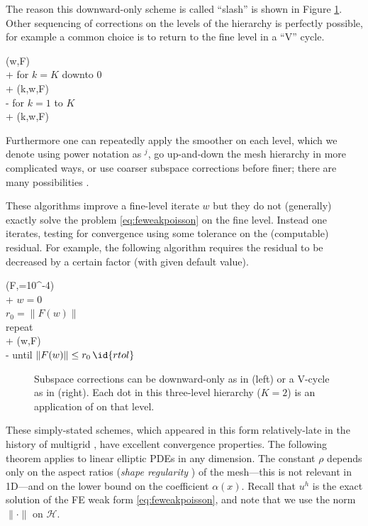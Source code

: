 \documentclass[letterpaper,final,12pt,reqno]{amsart}
\numberwithin{equation}{section}
\numberwithin{figure}{section}
\numberwithin{table}{section}
\begin{document}
The reason this downward-only scheme is called ``slash'' is shown in Figure \ref{fig:msccycles}.  Other sequencing of corrections on the levels of the hierarchy is perfectly possible, for example a common choice is to return to the fine level in a ``V'' cycle.
\begin{pseudo*}
(w,F)\text{:} \\+
    for $k=K$ downto $0$ \\+
        (k,w,F) \\-
    for $k=1$ to $K$ \\+
        (k,w,F)
\end{pseudo*}
Furthermore one can repeatedly apply the smoother on each level, which we denote using power notation as $^j$, go up-and-down the mesh hierarchy in more complicated ways, or use coarser subspace corrections before finer; there are many possibilities \cite{Trottenbergetal2001}.

These  algorithms improve a fine-level iterate $w$ but they do not (generally) exactly solve the problem \eqref{eq:feweakpoisson} on the fine level.  Instead one iterates, testing for convergence using some tolerance on the (computable) residual.  For example, the following algorithm requires the residual to be decreased by a certain factor (with given default value).
\begin{pseudo*}
(F,=10^{-4})\text{:} \\+
    $w=0$ \qquad\qquad\qquad\qquad\qquad {} \\
    $r_0 = \|F(w)\|$ \\
    repeat \\+
        (w,F) \qquad\qquad {} \\-
    until $\|F(w)\| \le r_0\, \id{rtol}$
\end{pseudo*}

\begin{figure}

\caption{Subspace corrections can be downward-only as in  (left) or a V-cycle as in  (right).  Each dot in this three-level hierarchy ($K=2$) is an application of  on that level.}
\label{fig:msccycles}
\end{figure}

These simply-stated schemes, which appeared in this form relatively-late in the history of multigrid \cite{Xu1992}, have excellent convergence properties.  The following theorem applies to linear elliptic PDEs in any dimension.  The constant $\rho$ depends only on the aspect ratios (\emph{shape regularity} \cite{Elmanetal2014}) of the mesh---this is not relevant in 1D---and on the lower bound on the coefficient $\alpha(x)$.  Recall that $u^h$ is the exact solution of the FE weak form \eqref{eq:feweakpoisson}, and note that we use the norm $\|\cdot\|$ on $\mathcal{H}$.
\end{document}
